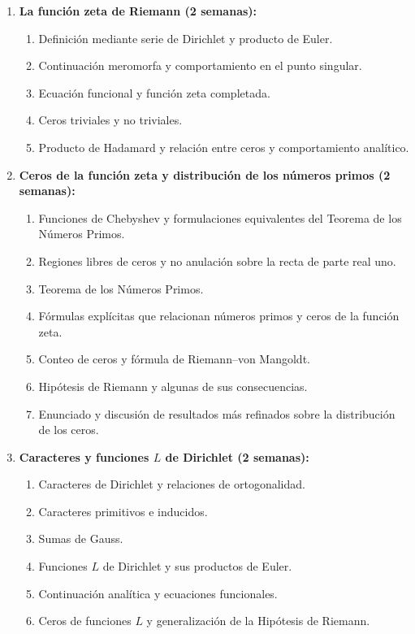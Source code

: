 \begin{refsection}
\begin{enumerate}
\item \textbf{La función zeta de Riemann (2 semanas):}
\begin{enumerate}
\item Definición mediante serie de Dirichlet y producto de Euler.
\item Continuación meromorfa y comportamiento en el punto singular.
\item Ecuación funcional y función zeta completada.
\item Ceros triviales y no triviales.
\item Producto de Hadamard y relación entre ceros y comportamiento analítico.
\end{enumerate}

\item \textbf{Ceros de la función zeta y distribución de los números primos (2 semanas):}
\begin{enumerate}
\item Funciones de Chebyshev y formulaciones equivalentes del Teorema de los Números Primos.
\item Regiones libres de ceros y no anulación sobre la recta de parte real uno.
\item Teorema de los Números Primos.
\item Fórmulas explícitas que relacionan números primos y ceros de la función zeta.
\item Conteo de ceros y fórmula de Riemann--von Mangoldt.
\item Hipótesis de Riemann y algunas de sus consecuencias.
\item Enunciado y discusión de resultados más refinados sobre la distribución de los ceros.
\end{enumerate}

\item \textbf{Caracteres y funciones $L$ de Dirichlet (2 semanas):}
\begin{enumerate}
\item Caracteres de Dirichlet y relaciones de ortogonalidad.
\item Caracteres primitivos e inducidos.
\item Sumas de Gauss.
\item Funciones $L$ de Dirichlet y sus productos de Euler.
\item Continuación analítica y ecuaciones funcionales.
\item Ceros de funciones $L$ y generalización de la Hipótesis de Riemann.
\end{enumerate}


\end{enumerate}
\end{refsection}
